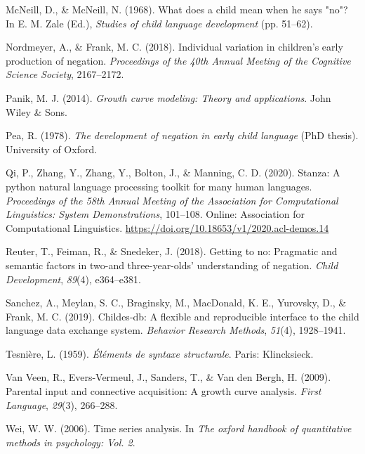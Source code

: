 \documentclass[
  man,floatsintext]{apa6}
\newlength{\cslhangindent}
\newlength{\cslentryspacingunit} %
\newenvironment{CSLReferences}[2] %
 {%
  \setlength{\parindent}{0pt}
  \ifodd #1
  \let\oldpar\par
  \def\par{\hangindent=\cslhangindent\oldpar}
  \fi
  \setlength{\parskip}{#2\cslentryspacingunit}
 }%
 {}
\begin{document}
\begin{CSLReferences}{1}{0}
\leavevmode{}%
McNeill, D., \& McNeill, N. (1968). What does a child mean when he says "no"? In E. M. Zale (Ed.), \emph{Studies of child language development} (pp. 51--62).

\leavevmode{}%
Nordmeyer, A., \& Frank, M. C. (2018). Individual variation in children's early production of negation. \emph{Proceedings of the 40th Annual Meeting of the Cognitive Science Society}, 2167--2172.

\leavevmode{}%
Panik, M. J. (2014). \emph{Growth curve modeling: Theory and applications}. John Wiley \& Sons.

\leavevmode{}%
Pea, R. (1978). \emph{The development of negation in early child language} (PhD thesis). University of Oxford.

\leavevmode{}%
Qi, P., Zhang, Y., Zhang, Y., Bolton, J., \& Manning, C. D. (2020). {S}tanza: A python natural language processing toolkit for many human languages. \emph{Proceedings of the 58th Annual Meeting of the Association for Computational Linguistics: System Demonstrations}, 101--108. Online: Association for Computational Linguistics. \url{https://doi.org/10.18653/v1/2020.acl-demos.14}

\leavevmode{}%
Reuter, T., Feiman, R., \& Snedeker, J. (2018). Getting to no: Pragmatic and semantic factors in two-and three-year-olds' understanding of negation. \emph{Child Development}, \emph{89}(4), e364--e381.

\leavevmode{}%
Sanchez, A., Meylan, S. C., Braginsky, M., MacDonald, K. E., Yurovsky, D., \& Frank, M. C. (2019). Childes-db: A flexible and reproducible interface to the child language data exchange system. \emph{Behavior Research Methods}, \emph{51}(4), 1928--1941.

\leavevmode{}%
Tesnière, L. (1959). \emph{{É}l{é}ments de syntaxe structurale}. Paris: Klincksieck.

\leavevmode{}%
Van Veen, R., Evers-Vermeul, J., Sanders, T., \& Van den Bergh, H. (2009). Parental input and connective acquisition: A growth curve analysis. \emph{First Language}, \emph{29}(3), 266--288.

\leavevmode{}%
Wei, W. W. (2006). Time series analysis. In \emph{The oxford handbook of quantitative methods in psychology: Vol. 2}.

\end{CSLReferences}
\end{document}
